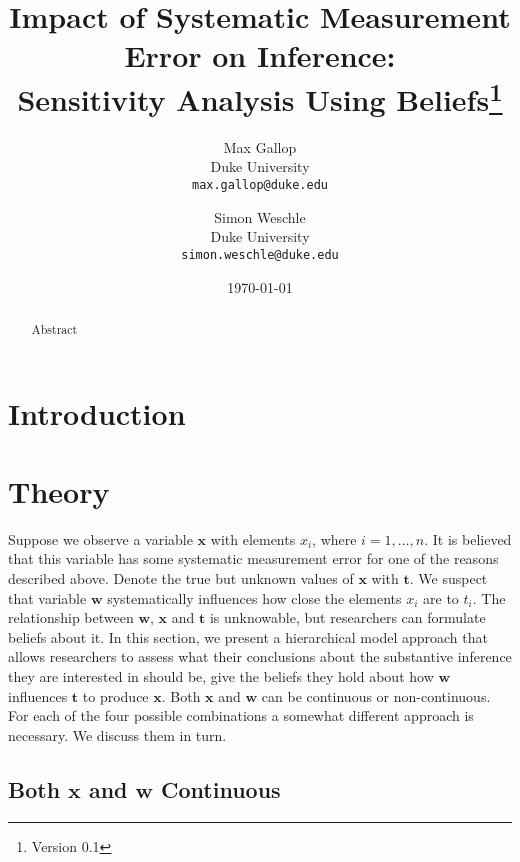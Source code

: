 \documentclass[fignum,letterpaper,12pt]{article}
\title{Impact of Systematic Measurement Error on Inference: \\ Sensitivity Analysis Using Beliefs\thanks{Version 0.1}}
\author{
Max Gallop \\
	Duke University\\
	\texttt{max.gallop@duke.edu}
\and
Simon Weschle \\
	Duke University\\
	\texttt{simon.weschle@duke.edu}\\ %
}
\date{\small{\today}}
\begin{document}

\maketitle
\thispagestyle{empty}

\begin{abstract}
\noindent
Abstract
\end{abstract}
\doublespacing
\clearpage



\newpage
\setcounter{page}{1}
\section{Introduction} \label{sec:introduction}

%

\section{Theory} \label{sec:theory}

Suppose we observe a variable $\mathbf{x}$ with elements $x_i$, where $i=1, \dots, n$. It is believed that this variable has some systematic measurement error for one of the reasons described above. Denote the true but unknown values of $\mathbf{x}$ with $\mathbf{t}$. We suspect that variable $\mathbf{w}$ systematically influences how close the elements $x_i$ are to $t_i$. The relationship between $\mathbf{w}$, $\mathbf{x}$ and $\mathbf{t}$ is unknowable, but researchers can formulate beliefs about it. In this section, we present a hierarchical model approach that allows researchers to assess what their conclusions about the substantive inference they are interested in should be, give the beliefs they hold about how $\mathbf{w}$ influences $\mathbf{t}$ to produce $\mathbf{x}$. Both $\mathbf{x}$ and $\mathbf{w}$ can be continuous or non-continuous. For each of the four possible combinations a somewhat different approach is necessary. We discuss them in turn.

\subsection{Both $\mathbf{x}$ and $\mathbf{w}$ Continuous} \label{subsec:case1}
\end{document}
